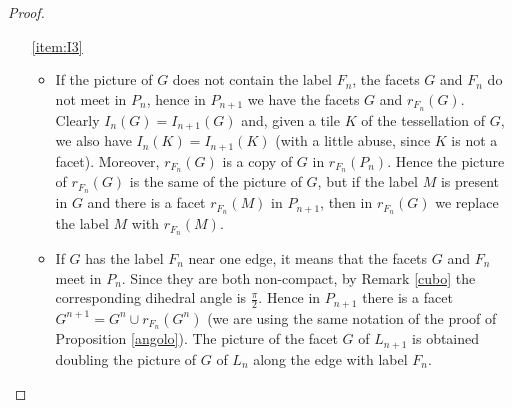 \documentclass{amsart}
\theoremstyle{definition}
\theoremstyle{remark}
\begin{document}
\begin{proof}
\begin{enumerate}
        \begin{itemize}
            \item If in \ref{item:I2} of $P_n$ we have $(F,G;k)$, then it means that the dihedral angle between the facets $F$ and $G$ of $P_n$ is $\frac{\pi}{k}$. The proof of each of the three subcases of the thesis is obvious, once noted that $r_{F_n}(G)$ is not in \ref{item:I1} of $P_{n+1}$ if and only if $(G,\frac{\pi}{2})\in I_n(F_n)$, and this holds if and only if $G\cup r_{F_n}(G)$ is a facet of $P_{n+1}$ that we call $G$.
            \item Since the label $F$ is in the picture of $F_n$ in \ref{item:I3} of $P_n$, the facet $F$ meets $F_n$ in $P_n$. Since in the Coxeter diagram of $P_0$ the edge between  $i$ and $j$ has label $2k>2$, by Proposition \ref{angolo}, the dihedral angle between $F$ and $F_n$ is $\frac{\pi}{2k}$. Hence the dihedral angle between $F$ and $r_{F_n}(F)$ in $P_{n+1}$ is $\frac{\pi}{k}$. Hence we add the edge $(F,r_{F_n}(F);k)$ to the graph.
        \end{itemize}
        By construction of $P_{n+1}$, there is no other edge to be added to the two graphs.
        \item[\ref{item:I3}]
        \begin{itemize}
            \item If the picture of $G$ does not contain the label $F_n$, the facets $G$ and $F_n$ do not meet in $P_n$, hence in $P_{n+1}$ we have the facets $G$ and $r_{F_n}(G)$. Clearly $I_n(G)=I_{n+1}(G)$ and, given a tile $K$ of the tessellation of $G$, we also have $I_n(K)=I_{n+1}(K)$ (with a little abuse, since $K$ is not a facet). Moreover, $r_{F_n}(G)$ is a copy of $G$ in $r_{F_n}(P_n)$. Hence the picture of $r_{F_n}(G)$ is the same of the picture of $G$, but if the label $M$ is present in $G$ and there is a facet $r_{F_n}(M)$ in $P_{n+1}$, then in $r_{F_n}(G)$ we replace the label $M$ with $r_{F_n}(M)$.
            \item If $G$ has the label $F_n$ near one edge, it means that the facets $G$ and $F_n$ meet in $P_n$. Since they are both non-compact, by Remark \ref{cubo} the corresponding dihedral angle is $\frac{\pi}{2}$. Hence in $P_{n+1}$ there is a facet $G^{n+1}=G^n\cup r_{F_n}(G^n)$ (we are using the same notation of the proof of Proposition \ref{angolo}). The picture of the facet $G$ of $L_{n+1}$ is obtained doubling  the picture of $G$ of $L_n$ along the edge with label $F_n$.
        \end{itemize}
    \end{enumerate}
\end{proof}
\end{document}
